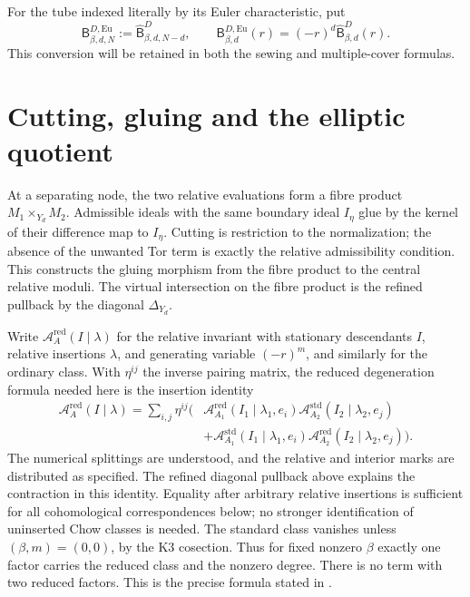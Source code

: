 For the tube indexed literally by its Euler characteristic, put
\begin{equation}\label{rdt:eq:Eu}
 \mathsf B^{D,\mathrm{Eu}}_{\beta,d,N}:=\widehat{\mathsf B}^D_{\beta,d,N-d},
 \qquad
 \mathsf B^{D,\mathrm{Eu}}_{\beta,d}(r)=(-r)^d\widehat{\mathsf B}^D_{\beta,d}(r).
\end{equation}
This conversion will be retained in both the sewing and
multiple-cover formulas.

\section{Cutting, gluing and the elliptic quotient}
\label{rdt:sec:glue}

At a separating node, the two relative evaluations form a fibre
product $M_1\times_{Y_d}M_2$. Admissible ideals with the same boundary
ideal $I_\eta$ glue by the kernel of their difference map to
$I_\eta$. Cutting is restriction to the normalization; the absence of
the unwanted Tor term is exactly the relative admissibility condition.
This constructs the gluing morphism from the fibre product to the
central relative moduli. The virtual intersection on the fibre product
is the refined pullback by the diagonal $\Delta_{Y_d}$.

Write $\mathcal A^{\mathrm{red}}_{A}(I\mid\lambda)$ for the relative
invariant with stationary descendants $I$, relative insertions
$\lambda$, and generating variable $(-r)^m$, and similarly for the
ordinary class. With $\eta^{ij}$ the inverse pairing matrix, the
reduced degeneration formula needed here is the insertion identity
\begin{equation}\label{rdt:eq:virtualglue}
\begin{aligned}
 \mathcal A^{\mathrm{red}}_{A}(I\mid\lambda)
  =\sum_{i,j}\eta^{ij}\bigl(&
    \mathcal A^{\mathrm{red}}_{A_1}(I_1\mid\lambda_1,e_i)
    \mathcal A^{\mathrm{std}}_{A_2}(I_2\mid\lambda_2,e_j)\\
   &+\mathcal A^{\mathrm{std}}_{A_1}(I_1\mid\lambda_1,e_i)
    \mathcal A^{\mathrm{red}}_{A_2}(I_2\mid\lambda_2,e_j)\bigr).
\end{aligned}
\end{equation}
The numerical splittings are understood, and the relative and
interior marks are distributed as specified. The refined diagonal
pullback above explains the contraction in this identity. Equality
after arbitrary relative insertions is sufficient for all
cohomological correspondences below; no stronger identification of
uninserted Chow classes is needed. The standard class vanishes unless
$(\beta,m)=(0,0)$, by the K3 cosection. Thus for fixed nonzero $\beta$
exactly one factor carries the reduced class and the nonzero degree.
There is no term with two reduced factors. This is the precise
formula stated in \cite[\S5.1]{OberdieckMC}.

